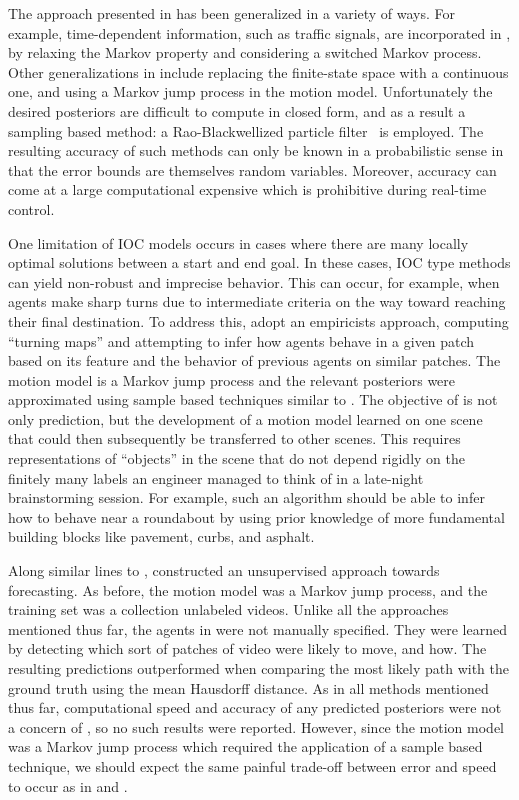 \documentclass[letterpaper,10pt,conference]{ieeeconf}
\begin{document}
The approach presented in \cite{Kitani2012} has been generalized in a variety of ways.
For example, time-dependent information, such as traffic signals, are incorporated in \cite{Karasev2016}, by relaxing the Markov property and considering a switched Markov process.
Other generalizations in \cite{Karasev2016} include replacing the finite-state space with a continuous one, and using a Markov jump process in the motion model.
Unfortunately the desired posteriors are difficult to compute in closed form, and as a result a sampling based method: a Rao-Blackwellized particle filter~\cite{Doucet2000} is employed.
The resulting accuracy of such methods can only be known in a probabilistic sense in that the error bounds are themselves random variables.
Moreover, accuracy can come at a large computational expensive which is prohibitive during real-time control.


One limitation of IOC models occurs in cases where there are many locally optimal solutions between a start and end goal.
In these cases, IOC type methods can yield non-robust and imprecise behavior.
This can occur, for example, when agents make sharp turns due to intermediate criteria on the way toward reaching their final destination.
To address this, \cite{Ballan2016} adopt an empiricists approach, computing ``turning maps'' and attempting to infer how agents behave in a given patch based on its feature and the behavior of previous agents on similar patches.
The motion model is a Markov jump process and the relevant posteriors were approximated using sample based techniques similar to \cite{Karasev2016}.
The objective of \cite{Ballan2016} is not only prediction, but the development of a motion model learned on one scene that could then subsequently be transferred to other scenes. 
This requires representations of ``objects'' in the scene that do not depend rigidly on the finitely many labels an engineer managed to think of in a late-night brainstorming session.
For example, such an algorithm should be able to infer how to behave near a roundabout by using prior knowledge of more fundamental building blocks like pavement, curbs, and asphalt.

Along similar lines to \cite{Ballan2016}, \cite{Walker2014} constructed an unsupervised approach towards forecasting.
As before, the motion model was a Markov jump process, and the training set was a collection unlabeled videos.
Unlike all the approaches mentioned thus far, the agents in \cite{Walker2014} were not manually specified.
They were learned by detecting which sort of patches of video were likely to move, and how.
The resulting predictions outperformed \cite{Kitani2012} when comparing the most likely path with the ground truth using the mean Hausdorff distance.
As in all methods mentioned thus far, computational speed and accuracy of any predicted posteriors were not a concern of \cite{Walker2014}, so no such results were reported.
However, since the motion model was a Markov jump process which required the application of a sample based technique, we should expect the same painful trade-off between error and speed to occur as in \cite{Karasev2016} and \cite{Ballan2016}.
\end{document}
